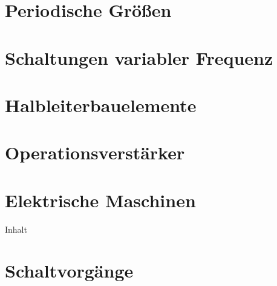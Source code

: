 \documentclass[twoside, a4paper]{article}
\begin{document}
\cleardoublepage
\part{Periodische Größen}

\cleardoublepage
\part{Schaltungen variabler Frequenz}

\cleardoublepage
\part{Halbleiterbauelemente}

\cleardoublepage
\part{Operationsverstärker}

\cleardoublepage
\part{Elektrische Maschinen}
{Inhalt}

\cleardoublepage
\part{Schaltvorgänge}


\cleardoublepage
\appendix
\setheadanhang

%

%


%

\clearpage
{}
\printindex
\end{document}
